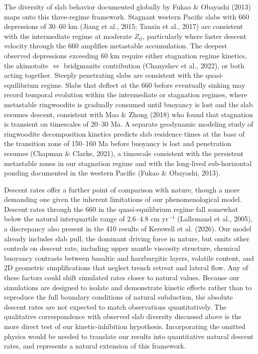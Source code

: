 \documentclass[draft,linenumbers]{agujournal2019}
\begin{document}
The diversity of slab behavior documented globally by Fukao \& Obayashi
(2013) maps onto this three-regime framework. Stagnant western Pacific
slabs with 660 depressions of 30--60 km (Jiang et al., 2015; Tauzin et
al., 2017) are consistent with the intermediate regime at moderate
\(Z_\mathrm{ri}\), particularly where faster descent velocity through
the 660 amplifies metastable accumulation. The deepest observed
depressions exceeding 60 km require either stagnation regime kinetics,
the akimotoite \(\Leftrightarrow\) bridgmanite contribution ({Chanyshev
et al.}, 2022), or both acting together. Steeply penetrating slabs are
consistent with the quasi-equilibrium regime. Slabs that deflect at the
660 before eventually sinking may record temporal evolution within the
intermediate or stagnation regimes, where metastable ringwoodite is
gradually consumed until buoyancy is lost and the slab resumes descent,
consistent with Mao \& Zhong (2018) who found that stagnation is
transient on timescales of 20--30 Ma. A separate geodynamic modeling
study of ringwoodite decomposition kinetics predicts slab residence
times at the base of the transition zone of 150--160 Ma before buoyancy
is lost and penetration resumes (Chapman \& Clarke, 2021), a timescale
consistent with the persistent metastable zones in our stagnation regime
and with the long-lived sub-horizontal ponding documented in the western
Pacific (Fukao \& Obayashi, 2013).

Descent rates offer a further point of comparison with nature, though a
more demanding one given the inherent limitations of our
phenomenological model. Descent rates through the 660 in the
quasi-equilibrium regime fall somewhat below the natural interquartile
range of 2.6--4.8 cm yr\(^{-1}\) (Lallemand et al., 2005), a discrepancy
also present in the 410 results of Kerswell et al. (2026). Our model
already includes slab pull, the dominant driving force in nature, but
omits other controls on descent rate, including upper mantle viscosity
structure, chemical buoyancy contrasts between basaltic and harzburgitic
layers, volatile content, and 2D geometric simplifications that neglect
trench retreat and lateral flow. Any of these factors could shift
simulated rates closer to natural values. Because our simulations are
designed to isolate and demonstrate kinetic effects rather than to
reproduce the full boundary conditions of natural subduction, the
absolute descent rates are not expected to match observations
quantitatively. The qualitative correspondence with observed slab
diversity discussed above is the more direct test of our
kinetic-inhibition hypothesis. Incorporating the omitted physics would
be needed to translate our results into quantitative natural descent
rates, and represents a natural extension of this framework.
\end{document}
